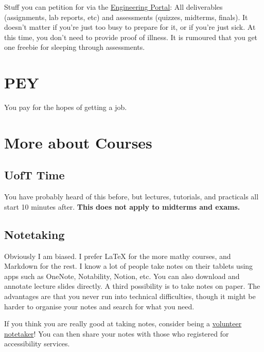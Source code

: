 Stuff you can petition for via the \href{https://www.google.com/url?sa=t&rct=j&q=&esrc=s&source=web&cd=&cad=rja&uact=8&ved=2ahUKEwjZj-qeh-7-AhX-kokEHX8-C8YQFnoECA0QAQ&url=http\%3A\%2F\%2Fundergrad.engineering.utoronto.ca\%2Fskule-\%2520\%2520\%2520\%2520\%2520\%2520\%2520\%2520\%2520\%2520\%2520\%2520life\%2Fthe-engineering-portal\%2F&usg=AOvVaw145xL8tAHUKBRq6D6rbDhS}{Engineering Portal}: All deliverables (assignments, lab reports, etc) and assessments (quizzes, midterms, finals). It doesn't matter if you're just too busy to prepare for it, or if you're just sick. At this time, you don't need to provide proof of illness. It is rumoured that you get one freebie for sleeping through assessments.

\section{PEY}

You pay for the hopes of getting a job.

\section{More about Courses}

\subsection{UofT Time}

You have probably heard of this before, but lectures, tutorials, and practicals all start 10 minutes after. \textbf{This does not apply to midterms and exams.}

\subsection{Notetaking}

Obviously I am biased. I prefer LaTeX for the more mathy courses, and Markdown for the rest. I know a lot of people take notes on their tablets using apps such as OneNote, Notability, Notion, etc. You can also download and annotate lecture slides directly. A third possibility is to take notes on paper. The advantages are that you never run into technical difficulties, though it might be harder to organise your notes and search for what you need.

If you think you are really good at taking notes, consider being a \href{https://studentlife.utoronto.ca/program/volunteer-note-taking/}{volunteer notetaker}! You can then share your notes with those who registered for accessibility services.

